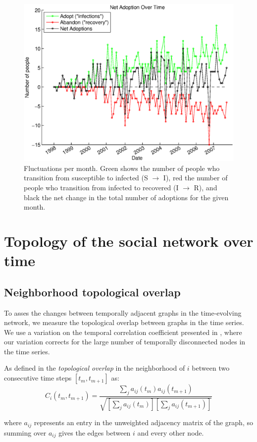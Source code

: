 \documentclass[12pt]{article}
\begin{document}
\begin{figure}[H]
\includegraphics[width = .7\textwidth]{Graficos/trans.eps}
\caption{Fluctuations per month. Green shows the number of people who transition from susceptible to infected (S \(\rightarrow\) I), red the number of people who transition from infected to recovered (I \(\rightarrow\) R), and black the net change in the total number of adoptions for the given month.}
\label{fig:trans}
\end{figure}

\section{Topology of the social network over time}

\subsection{Neighborhood topological overlap}

To asses the changes between temporally adjacent graphs in the time-evolving network, we measure the topological overlap between graphs in the time series. We use a variation on the temporal correlation coefficient presented in \cite{3}, where our variation corrects for the large number of temporally disconnected nodes in the time series.

As defined in \cite{3}  the \emph{topological overlap} in the neighborhood of \(i\) between two consecutive time steps \([t_m,t_{m+1}]\) as:
\begin{equation}
C_i(t_m,t_{m+1}) = \frac{ \sum_j a_{ij}(t_m)a_{ij}(t_{m+1})}{\sqrt{[ \sum_j a_{ij}(t_m)][ \sum_j a_{ij}(t_{m+1})]}}
\label{eq:Ci}
\end{equation}

where \(a_{ij}\) represents an entry in the unweighted adjacency matrix of the graph, so summing over \(a_{ij}\) gives the edges between \(i\) and every other node.
\end{document}
